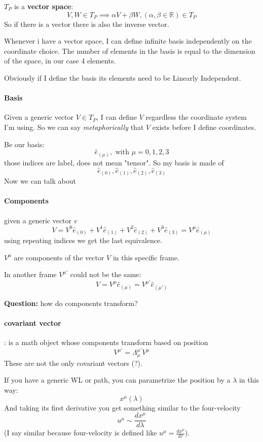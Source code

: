 $T_{P}$ is a \textbf{vector space}:
\[
	V,W \in T_{P} \implies \alpha V + \beta W, \left( \alpha , \beta \in \mathbb{R} \right) \in T_{P}
\]
So if there is a vector there is also the inverse vector.\par
Whenever i have a vector space, I can define infinite basis independently on the coordinate choice. The number of elements in the basis is equal to the dimension of the space, in our case 4 elements.\par
Obviously if I define the basis its elements need to be Linearly Independent. 

\paragraph{Basis}
Given a generic vector $V \in T_{P}$, I can define $V$ regardless the coordinate system I'm using. So we can say \emph{metaphorically} that $V$ exists before I define coordinates.\par
Be our basis:
\[
\hat{e}_{\left( \mu  \right)}, \text{ with } \mu = 0,1,2,3	
\]
those indices are label, does not mean "tensor". So my basis is made of \[
\hat{e}_{\left( 0 \right)}, \hat{e}_{\left( 1 \right)}, \hat{e}_{\left( 2 \right)}, \hat{e}_{\left( 3 \right)}
\]
Now we can talk about
\paragraph{Components}
given a generic vector $v$ 
\[
V = V^{0}\hat{e}_{\left( 0 \right)} + V^{1}\hat{e}_{\left( 1 \right)} + V^{2}\hat{e}_{\left( 2 \right)} + V^{3}\hat{e}_{\left( 3 \right)} =  V^{\mu }\hat{e}_{\left( \mu  \right) }
\]
using repeating indices we get the last equivalence.

$V^{\mu }$ are components of the vector $V$ in this specific frame. \par
In another frame $V^{\mu '}$ could not be the same:
\[
	V = V^{\mu }\hat{e}_{\left( \mu  \right)} = V^{\mu '}\hat{e}_{\left( \mu ' \right)}
\]

\textbf{Question:} how do components transform?
\paragraph{covariant vector}: is a math object whose components transform based on position
\[
V^{\mu '} = \Lambda^{\mu '}_{\mu }V^{\mu }
\]
These are not the only covariant vectors (?).

If you have a generic WL or path, you can parametrize the position by a $\lambda$ in this way:
\[
x^{\mu }\left( \lambda  \right)
\]
And taking its first derivative you get something similar to the four-velocity
\[
u^{\mu }\sim \frac{dx^{\mu }}{d\lambda }
\]
(I say similar because four-velocity is defined like $u^{\mu } = \frac{dx^{\mu }}{d\tau }$).

